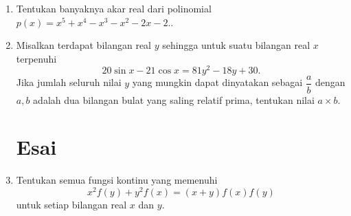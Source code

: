 \documentclass[12pt]{scrartcl}
\begin{document}
\begin{enumerate}
    \item Tentukan banyaknya akar real dari polinomial $p(x)=x^5+x^4-x^3-x^2-2x-2.$.

    \item Misalkan terdapat bilangan real $y$ sehingga untuk suatu bilangan real $x$ terpenuhi
    $$20\sin x-21\cos x=81y^2-18y+30.$$
    Jika jumlah seluruh nilai $y$ yang mungkin dapat dinyatakan sebagai $\dfrac{a}{b}$ dengan $a,b$ adalah dua bilangan bulat yang saling relatif prima, tentukan nilai $a \times b$.

\section{Esai}
    \item Tentukan semua fungsi kontinu yang memenuhi
    $$x^2f(y) + y^2f(x) = (x + y)f(x)f(y)$$
    untuk setiap bilangan real $x$ dan $y$.
\end{enumerate}
\end{document}
